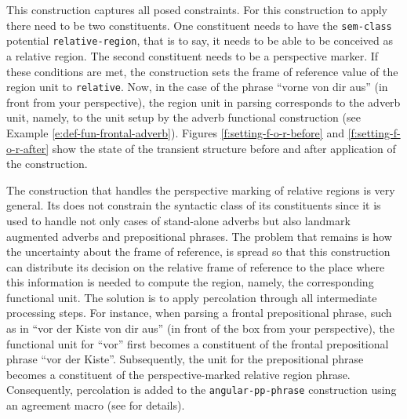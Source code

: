 This construction captures all posed constraints. 
For this construction to apply there need to be two constituents. 
One constituent needs to have the {\footnotesize\tt sem-class} potential 
{\footnotesize\tt relative-region}, that is to say, it needs to be
able to be conceived as a relative region. The second constituent needs 
to be a perspective marker. If these conditions are met, 
the construction sets the frame of reference 
value of the region unit to {\footnotesize\tt relative}. Now, in the case of the 
phrase ``vorne von dir aus''  (in front from your 
perspective), the region unit in parsing corresponds to the adverb unit, namely, 
to the unit setup by the adverb functional construction 
(see Example \ref{e:def-fun-frontal-adverb}). Figures \ref{f:setting-f-o-r-before} and
\ref{f:setting-f-o-r-after} show the state of the transient structure before and after application of the construction.

The construction that handles the perspective marking of relative regions is very general.
Its does not constrain the syntactic class of its constituents since it is used to
handle not only cases of stand-alone adverbs but also landmark augmented adverbs 
and prepositional phrases. The problem that remains is how the uncertainty about 
the frame of reference, is spread so that this construction 
can distribute its decision on the relative frame of reference to the place where
this information is needed to compute the region, namely, the corresponding functional unit. 
The solution is to apply percolation through all intermediate processing steps. 
For instance, when parsing a frontal prepositional phrase,
such as in ``vor der Kiste von dir aus'' (in front of the box from your perspective), the 
functional unit for ``vor'' first becomes a constituent of the frontal prepositional phrase 
``vor der Kiste''. Subsequently, the unit for the prepositional phrase becomes a constituent of 
the perspective-marked relative region phrase. Consequently, percolation is added
to the {\footnotesize\tt angular-pp-phrase} construction using an 
agreement macro (see \citealp{steels2011phrasal,steels2011design} for details).

